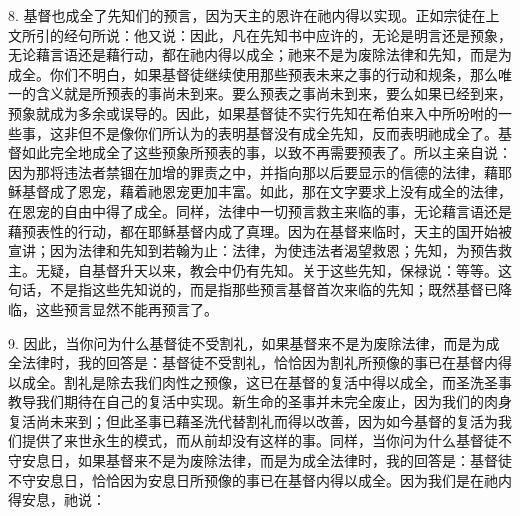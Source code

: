 8. 基督也成全了先知们的预言，因为天主的恩许在祂内得以实现。正如宗徒在上文所引的经句所说：他又说：因此，凡在先知书中应许的，无论是明言还是预象，无论藉言语还是藉行动，都在祂内得以成全；祂来不是为废除法律和先知，而是为成全。你们不明白，如果基督徒继续使用那些预表未来之事的行动和规条，那么唯一的含义就是所预表的事尚未到来。要么预表之事尚未到来，要么如果已经到来，预象就成为多余或误导的。因此，如果基督徒不实行先知在希伯来入中所吩咐的一些事，这非但不是像你们所认为的表明基督没有成全先知，反而表明祂成全了。基督如此完全地成全了这些预象所预表的事，以致不再需要预表了。所以主亲自说：因为那将违法者禁锢在加增的罪责之中，并指向那以后要显示的信德的法律，藉耶稣基督成了恩宠，藉着祂恩宠更加丰富。如此，那在文字要求上没有成全的法律，在恩宠的自由中得了成全。同样，法律中一切预言救主来临的事，无论藉言语还是藉预表性的行动，都在耶稣基督内成了真理。因为在基督来临时，天主的国开始被宣讲；因为法律和先知到若翰为止：法律，为使违法者渴望救恩；先知，为预告救主。无疑，自基督升天以来，教会中仍有先知。关于这些先知，保禄说：等等。这句话，不是指这些先知说的，而是指那些预言基督首次来临的先知；既然基督已降临，这些预言显然不能再预言了。\par

9. 因此，当你问为什么基督徒不受割礼，如果基督来不是为废除法律，而是为成全法律时，我的回答是：基督徒不受割礼，恰恰因为割礼所预像的事已在基督内得以成全。割礼是除去我们肉性之预像，这已在基督的复活中得以成全，而圣洗圣事教导我们期待在自己的复活中实现。新生命的圣事并未完全废止，因为我们的肉身复活尚未来到；但此圣事已藉圣洗代替割礼而得以改善，因为如今基督的复活为我们提供了来世永生的模式，而从前却没有这样的事。同样，当你问为什么基督徒不守安息日，如果基督来不是为废除法律，而是为成全法律时，我的回答是：基督徒不守安息日，恰恰因为安息日所预像的事已在基督内得以成全。因为我们是在祂内得安息，祂说：\par

